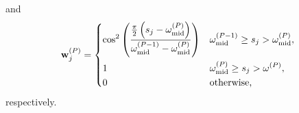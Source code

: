 \documentclass[12pt]{article}
\newcommand{\wVec}{\mathbf{w}}	%
\newcommand{\partition}{\omega}  %
\newcommand{\midpoint}{\partition_{\text{mid}}}   %
\newcommand{\singular}{s}	%
\newtheorem{proposition}{Proposition}[section]
\begin{document}
and
\begin{equation}
\label{eq:Last cosine window}
    \wVec_j^{(P)} = \begin{dcases}
    \cos^2\left(\frac{\frac{\pi}{2}\left(\singular_j - \midpoint^{(P)}\right)}{\midpoint^{(P-1)} - \midpoint^{(P)}}\right) & \midpoint^{(P-1)} \geq \singular_j > \midpoint^{(P)}, \\
    1 & \midpoint^{(P)} \geq \singular_j > \omega^{(P)}, \\
    0 & \text{otherwise,}
    \end{dcases}
\end{equation}
respectively.
\end{document}
